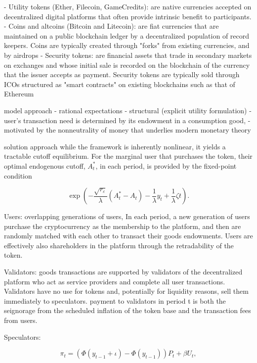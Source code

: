   - Utility tokens (Ether, Filecoin, GameCredits): are native currencies accepted on decentralized digital platforms that often provide intrinsic benefit to participants.
  - Coins and altcoins (Bitcoin and Litecoin): are fiat currencies that are maintained on a public blockchain ledger by a decentralized population of record keepers. Coins are typically created through "forks" from existing currencies, and by airdrops
  - Security tokens: are financial assets that trade in secondary markets on exchanges and whose initial sale is recorded on the blockchain of the currency that the issuer accepts as payment. Security tokens are typically sold through ICOs structured as "smart contracts" on existing blockchains such as that of Ethereum

model approach
  - rational expectations
  - structural (explicit utility formulation)
  - user's transaction need is determined by its endowment in a consumption good,
  - motivated by the nonneutrality of money that underlies modern monetary theory

solution approach
while the framework is inherently nonlinear, it yields a tractable cutoff equilibrium. For the marginal user that purchases the token, their optimal endogenous cutoff, $A_t^{*}$, in each period, is provided by the fixed-point condition

\begin{equation}
    \exp{\left(-\frac{\sqrt{r_{\varepsilon}}}{\lambda}\left(A_{t}^{*}-A_{t}\right)-\frac{1}{\lambda}y_{t}+\frac{1}{\lambda}\zeta t\right)}.
\end{equation}

 
Users: overlapping generations of users, In each period, a new generation of users purchase the cryptocurrency as the membership to the platform, and then are randomly matched with each other to transact their goods endowments. Users are effectively also shareholders in the platform through the retradability of the token.

Validators: goods transactions are supported by validators of the decentralized platform who act as service providers and complete all user transactions. Validators have no use for tokens and, potentially for liquidity reasons, sell them immediately to speculators. payment to validators in period t is both the seignorage from the scheduled inflation of the token base and the transaction fees from users.

Speculators: 

\begin{equation}
    \pi_{t}=\left(\Phi\left(y_{t-1}+\iota\right)-\Phi\left(y_{t-1}\right)\right)P_{t}+\beta U_{t},
\end{equation}

